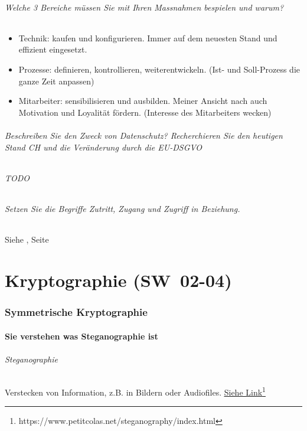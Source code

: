 \documentclass[10pt,a4paper]{article}
\begin{document}
\paragraph*{Welche 3 Bereiche müssen Sie mit Ihren Massnahmen bespielen und warum?}
\begin{itemize}[noitemsep,topsep=0pt,leftmargin=*]
    \item Technik: kaufen und konfigurieren. Immer auf dem neuesten Stand und effizient eingesetzt.
    \item Prozesse: definieren, kontrollieren, weiterentwickeln. (Ist- und Soll-Prozess die ganze Zeit anpassen)
    \item Mitarbeiter: sensibilisieren und ausbilden. Meiner Ansicht nach auch Motivation und Loyalität fördern. (Interesse des Mitarbeiters wecken)
\end{itemize}

\paragraph*{Beschreiben Sie den Zweck von Datenschutz? Recherchieren Sie den heutigen Stand CH und die Veränderung durch die EU-DSGVO}
\paragraph*{TODO}

\paragraph*{Setzen Sie die Begriffe Zutritt, Zugang und Zugriff in Beziehung.}{Siehe \underline{}, Seite \pageref{sec:Grundbegriffe}}


\part{Kryptographie (SW~02-04)}
\section{Symmetrische Kryptographie}
\subsection*{Sie verstehen was Steganographie ist}
\paragraph*{Steganographie}Verstecken von Information, z.B. in Bildern oder Audiofiles. \underline{\href{https://www.petitcolas.net/steganography/index.html}{Siehe Link}}\footnote{https://www.petitcolas.net/steganography/index.html}
\end{document}
